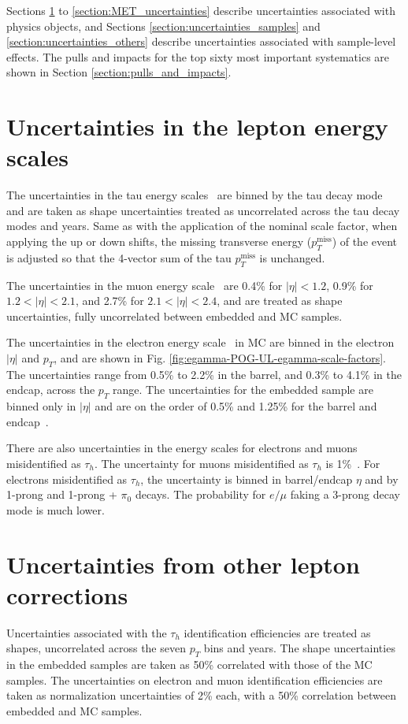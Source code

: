 Sections \ref{section:uncertainties_lepton_energy_scales} to \ref{section:MET_uncertainties} describe uncertainties associated with physics objects, and Sections \ref{section:uncertainties_samples} and \ref{section:uncertainties_others} describe uncertainties associated with sample-level effects. The pulls and impacts for the top sixty most important systematics are shown in Section \ref{section:pulls_and_impacts}.



\section{Uncertainties in the lepton energy scales}
\label{section:uncertainties_lepton_energy_scales}
The uncertainties in the tau energy scales~\cite{twiki_TAU_POG_tauidrecommendationforrun2} are binned by the tau decay mode and are taken as shape uncertainties treated as uncorrelated across the tau decay modes and years. Same as with the application of the nominal scale factor, when applying the up or down shifts, the missing transverse energy ($p_{T}^{\text{miss}}$) of the event is adjusted so that the 4-vector sum of the tau $p_{T}^{\text{miss}}$ is unchanged.

The uncertainties in the muon energy scale~\cite{twiki_MUON_POG_recommendation} are 0.4\% for $|\eta| < 1.2$, 0.9\% for $1.2 < |\eta| < 2.1$, and 2.7\% for $2.1 < |\eta| < 2.4$, and are treated as shape uncertainties, fully uncorrelated between embedded and MC samples.

The uncertainties in the electron energy scale~\cite{twiki_Electron_POG_recommendation} in MC are binned in the electron $|\eta|$ and $p_{T}$, and are shown in Fig. \ref{fig:egamma-POG-UL-egamma-scale-factors}. The uncertainties range from 0.5\% to 2.2\% in the barrel, and 0.3\% to 4.1\% in the endcap, across the $p_{T}$ range. The uncertainties for the embedded sample are binned only in $|\eta|$ and are on the order of 0.5\% and 1.25\% for the barrel and endcap~\cite{twiki_embedded_preUL_2018}.

There are also uncertainties in the energy scales for electrons and muons misidentified as $\tau_{h}$. The uncertainty for muons misidentified as $\tau_{h}$ is 1\%~\cite{twiki_TAU_POG_tauidrecommendationforrun2}. For electrons misidentified as $\tau_{h}$, the uncertainty is binned in barrel/endcap $\eta$ and by 1-prong and 1-prong + $\pi_0$ decays. The probability for $e/\mu$ faking a 3-prong decay mode is much lower. 

\section{Uncertainties from other lepton corrections}
Uncertainties associated with the $\tau_{h}$ identification efficiencies are treated as shapes, uncorrelated across the seven $p_{T}$ bins and years. The shape uncertainties in the embedded samples are taken as 50\% correlated with those of the MC samples. The uncertainties on electron and muon identification efficiencies are taken as normalization uncertainties of 2\% each, with a 50\% correlation between embedded and MC samples.

